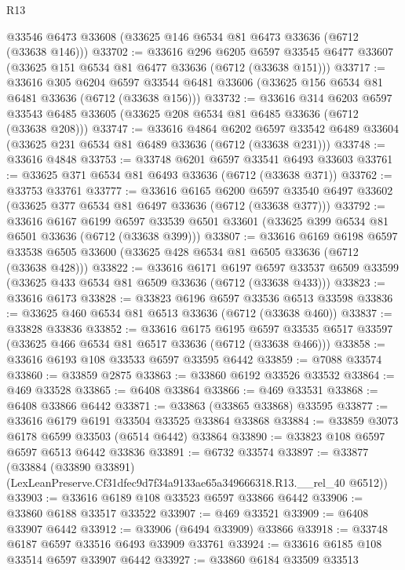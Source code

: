 \begin{lexlean}{R13}
\begin{coremodule}
    @33546
    @6473
    @33608
    (@33625 @146 @6534 @81 @6473 @33636 (@6712 (@33638 @146)))
@33702 := @33616
    @296
    @6205
    @6597
    @33545
    @6477
    @33607
    (@33625 @151 @6534 @81 @6477 @33636 (@6712 (@33638 @151)))
@33717 := @33616
    @305
    @6204
    @6597
    @33544
    @6481
    @33606
    (@33625 @156 @6534 @81 @6481 @33636 (@6712 (@33638 @156)))
@33732 := @33616
    @314
    @6203
    @6597
    @33543
    @6485
    @33605
    (@33625 @208 @6534 @81 @6485 @33636 (@6712 (@33638 @208)))
@33747 := @33616
    @4864
    @6202
    @6597
    @33542
    @6489
    @33604
    (@33625 @231 @6534 @81 @6489 @33636 (@6712 (@33638 @231)))
@33748 := @33616 @4848
@33753 := @33748 @6201 @6597 @33541 @6493 @33603
@33761 := @33625 @371 @6534 @81 @6493 @33636 (@6712 (@33638 @371))
@33762 := @33753 @33761
@33777 := @33616
    @6165
    @6200
    @6597
    @33540
    @6497
    @33602
    (@33625 @377 @6534 @81 @6497 @33636 (@6712 (@33638 @377)))
@33792 := @33616
    @6167
    @6199
    @6597
    @33539
    @6501
    @33601
    (@33625 @399 @6534 @81 @6501 @33636 (@6712 (@33638 @399)))
@33807 := @33616
    @6169
    @6198
    @6597
    @33538
    @6505
    @33600
    (@33625 @428 @6534 @81 @6505 @33636 (@6712 (@33638 @428)))
@33822 := @33616
    @6171
    @6197
    @6597
    @33537
    @6509
    @33599
    (@33625 @433 @6534 @81 @6509 @33636 (@6712 (@33638 @433)))
@33823 := @33616 @6173
@33828 := @33823 @6196 @6597 @33536 @6513 @33598
@33836 := @33625 @460 @6534 @81 @6513 @33636 (@6712 (@33638 @460))
@33837 := @33828 @33836
@33852 := @33616
    @6175
    @6195
    @6597
    @33535
    @6517
    @33597
    (@33625 @466 @6534 @81 @6517 @33636 (@6712 (@33638 @466)))
@33858 := @33616 @6193 @108 @33533 @6597 @33595 @6442
@33859 := @7088 @33574
@33860 := @33859 @2875
@33863 := @33860 @6192 @33526 @33532
@33864 := @469 @33528
@33865 := @6408 @33864
@33866 := @469 @33531
@33868 := @6408 @33866 @6442
@33871 := @33863 (@33865 @33868) @33595
@33877 := @33616 @6179 @6191 @33504 @33525 @33864 @33868
@33884 := @33859 @3073 @6178 @6599 @33503 (@6514 @6442) @33864
@33890 := @33823 @108 @6597 @6597 @6513 @6442 @33836
@33891 := @6732 @33574
@33897 := @33877
    (@33884 (@33890 @33891) (LexLeanPreserve.Cf31dfec9d7f34a9133ae65a349666318.R13.__rel_40 @6512))
@33903 := @33616 @6189 @108 @33523 @6597 @33866 @6442
@33906 := @33860 @6188 @33517 @33522
@33907 := @469 @33521
@33909 := @6408 @33907 @6442
@33912 := @33906 (@6494 @33909) @33866
@33918 := @33748 @6187 @6597 @33516 @6493 @33909 @33761
@33924 := @33616 @6185 @108 @33514 @6597 @33907 @6442
@33927 := @33860 @6184 @33509 @33513

\end{coremodule}
\end{lexlean}
